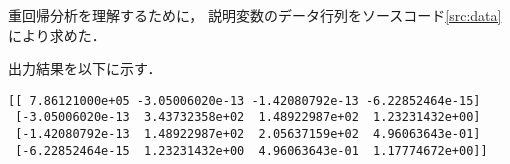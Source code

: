 \documentclass[uplatex]{jsarticle}
\begin{document}
重回帰分析を理解するために，
説明変数のデータ行列をソースコード\ref{src:data}により求めた．



出力結果を以下に示す．
\begin{screen}
\begin{verbatim}
[[ 7.86121000e+05 -3.05006020e-13 -1.42080792e-13 -6.22852464e-15]
 [-3.05006020e-13  3.43732358e+02  1.48922987e+02  1.23231432e+00]
 [-1.42080792e-13  1.48922987e+02  2.05637159e+02  4.96063643e-01]
 [-6.22852464e-15  1.23231432e+00  4.96063643e-01  1.17774672e+00]]
\end{verbatim}
\end{screen}
\end{document}
